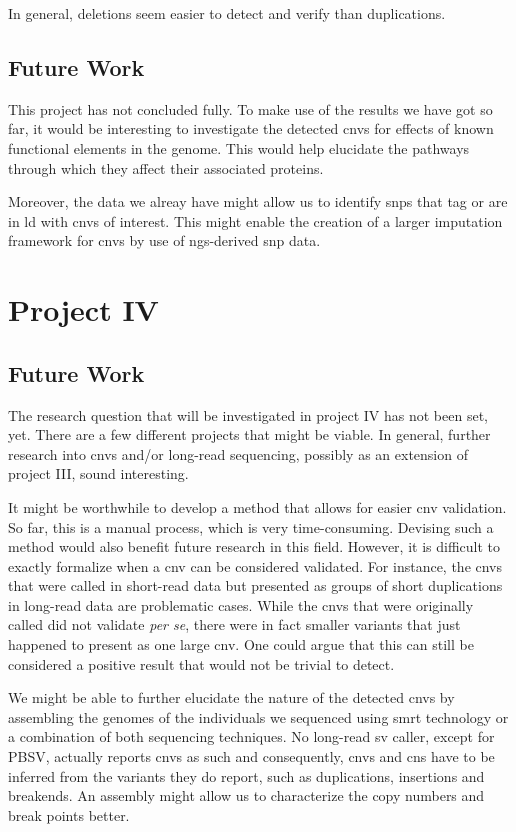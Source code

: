 \documentclass[twoside=false]{scrbook}
\begin{document}
In general, deletions seem easier to detect and verify than duplications.

\section{Future Work}
This project has not concluded fully.
To make use of the results we have got so far, it would be interesting to investigate the detected \glspl{cnv} for effects of known functional elements in the genome.
This would help elucidate the pathways through which they affect their associated proteins.

Moreover, the data we alreay have might allow us to identify \glspl{snp} that tag or are in \gls{ld} with \glspl{cnv} of interest.
This might enable the creation of a larger imputation framework for \glspl{cnv} by use of \gls{ngs}-derived \gls{snp} data.

\chapter{Project IV}
\section{Future Work}
The research question that will be investigated in project IV has not been set, yet.
There are a few different projects that might be viable.
In general, further research into \glspl{cnv} and/or long-read sequencing, possibly as an extension of project III, sound interesting.

It might be worthwhile to develop a method that allows for easier \gls{cnv} validation.
So far, this is a manual process, which is very time-consuming.
Devising such a method would also benefit future research in this field.
However, it is difficult to exactly formalize when a \gls{cnv} can be considered validated.
For instance, the \glspl{cnv} that were called in short-read data but presented as groups of short duplications in long-read data are problematic cases.
While the \glspl{cnv} that were originally called did not validate \textit{per se}, there were in fact smaller variants that just happened to present as one large \gls{cnv}.
One could argue that this can still be considered a positive result that would not be trivial to detect.

We might be able to further elucidate the nature of the detected \glspl{cnv} by assembling the genomes of the individuals we sequenced using \gls{smrt} technology or a combination of both sequencing techniques.
No long-read \gls{sv} caller, except for \textsf{PBSV}, actually reports \glspl{cnv} as such and consequently, \glspl{cnv} and \glspl{cn} have to be inferred from the variants they do report, such as duplications, insertions and breakends.
An assembly might allow us to characterize the copy numbers and break points better.
\end{document}
